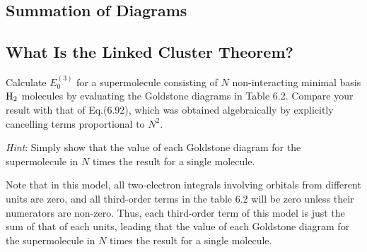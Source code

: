 \documentclass[a4paper]{book}
\newcounter{exercise}[chapter]
\newcounter{solution}[chapter]
\begin{document}
	\subsection{Summation of Diagrams}
	
	\subsection{What Is the Linked Cluster Theorem?}
	
	\begin{exercise}
	Calculate $E^{(3)}_0$ for a supermolecule consisting of $N$ non-interacting minimal basis $\ce{H2}$ molecules by evaluating the Goldstone diagrams in Table 6.2. Compare your result with that of Eq.(6.92), which was obtained algebraically by explicitly cancelling terms proportional to $N^2$.
	
	{\it Hint}: Simply show that the value of each Goldstone diagram for the supermolecule in $N$ times the result for a single molecule.
	\end{exercise}
	
	\begin{solution}
	Note that in this model, all two-electron integrals involving orbitals from different units are zero, and all third-order terms in the table 6.2 will be zero unless their numerators are non-zero. Thus, each third-order term of this model is just the sum of that of each units, leading that the value of each Goldstone diagram for the supermolecule in $N$ times the result for a single molecule.
	\end{solution}
\end{document}

